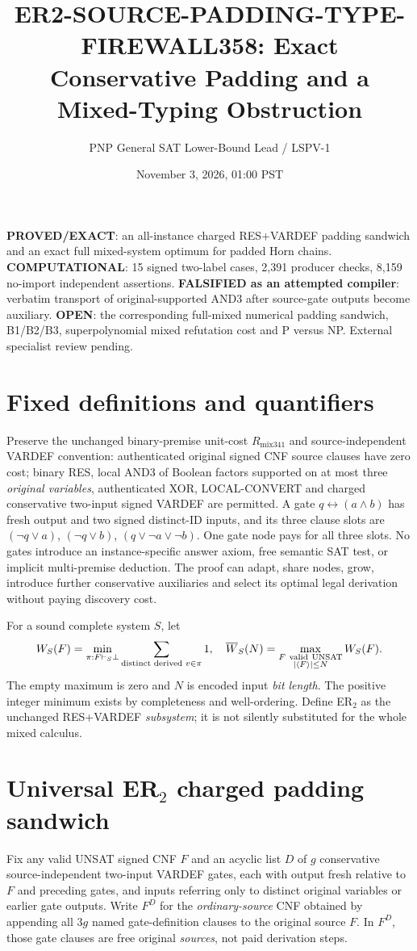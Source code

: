 \documentclass[11pt]{article}
\title{ER2-SOURCE-PADDING-TYPE-FIREWALL358: Exact Conservative Padding and a Mixed-Typing Obstruction}
\author{PNP General SAT Lower-Bound Lead / LSPV-1}
\date{November 3, 2026, 01:00 PST}
\begin{document}
\maketitle
\noindent\textbf{PROVED/EXACT}: an all-instance charged RES+VARDEF padding sandwich and an exact full mixed-system optimum for padded Horn chains. \textbf{COMPUTATIONAL}: 15 signed two-label cases, 2,391 producer checks, 8,159 no-import independent assertions. \textbf{FALSIFIED as an attempted compiler}: verbatim transport of original-supported AND3 after source-gate outputs become auxiliary. \textbf{OPEN}: the corresponding full-mixed numerical padding sandwich, B1/B2/B3, superpolynomial mixed refutation cost and P versus NP. External specialist review pending.

\section*{Fixed definitions and quantifiers}
Preserve the unchanged binary-premise unit-cost $R_{\mathrm{mix341}}$ and source-independent VARDEF convention: authenticated original signed CNF source clauses have zero cost; binary RES, local AND3 of Boolean factors supported on at most three \emph{original variables}, authenticated XOR, LOCAL-CONVERT and charged conservative two-input signed VARDEF are permitted. A gate $q\leftrightarrow(a\wedge b)$ has fresh output and two signed distinct-ID inputs, and its three clause slots are $(\neg q\vee a)$, $(\neg q\vee b)$, $(q\vee\neg a\vee\neg b)$. One gate node pays for all three slots. No gates introduce an instance-specific answer axiom, free semantic SAT test, or implicit multi-premise deduction. The proof can adapt, share nodes, grow, introduce further conservative auxiliaries and select its optimal legal derivation without paying discovery cost.

For a sound complete system $S$, let
\[
W_S(F)=\min_{\pi:F\vdash_S\bot}\sum_{\text{distinct derived }v\in\pi}1,\quad
\overline W_S(N)=\max_{\substack{F\ {\rm valid\ UNSAT}\\|\langle F\rangle|\le N}}W_S(F).
\]
The empty maximum is zero and $N$ is encoded input \emph{bit length}. The positive integer minimum exists by completeness and well-ordering. Define ER$_2$ as the unchanged RES+VARDEF \emph{subsystem}; it is not silently substituted for the whole mixed calculus.

\section*{Universal ER$_2$ charged padding sandwich}
Fix any valid UNSAT signed CNF $F$ and an acyclic list $D$ of $g$ conservative source-independent two-input VARDEF gates, each with output fresh relative to $F$ and preceding gates, and inputs referring only to distinct original variables or earlier gate outputs. Write $F^D$ for the \emph{ordinary-source} CNF obtained by appending all $3g$ named gate-definition clauses to the original source $F$. In $F^D$, those gate clauses are free original \emph{sources}, not paid derivation steps.
\end{document}
